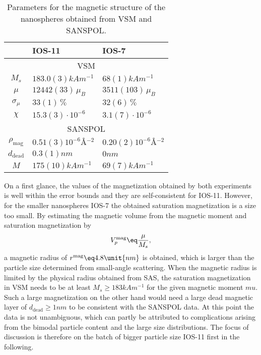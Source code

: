 \documentclass[\main/dresen_thesis.tex]{subfiles}
\begin{document}
\begin{table}[tb]
  \centering
  \caption{\label{tab:looselyPackedNP:nanoparticle:vsmSanspol}Parameters for the magnetic structure of the nanospheres obtained from VSM and SANSPOL.}
  \begin{tabular}{ c | l | l }
      & IOS-11 & IOS-7 \\
    \hline
    \multicolumn{3}{c}{VSM}\\
    \hline
    $M_s$
      & $183.0(3) \unit{kAm^{-1}}$
      & $68(1) \unit{kAm^{-1}}$\\
    $\mu$
      & $12442(33) \, \mu_B$
      & $3511(103) \, \mu_B$\\
    $\sigma_{\mu}$
      & $33(1) \, \%$
      & $32(6) \, \%$\\
    $\chi$
      & $15.3(3) \cdot \unit{10^{-6}}$
      & $3.1(7) \cdot \unit{10^{-6}}$\\
    \hline
    \multicolumn{3}{c}{SANSPOL}\\
    \hline
    $\rho_\mathrm{mag}$
      & $0.51(3) \unit{10^{-6} \angstrom^{-2}}$
      & $0.20(2) \unit{10^{-6} \angstrom^{-2}}$\\
    $d_\mathrm{dead}$
      & $0.3(1) \unit{nm}$
      & $0 \unit{nm}$\\
    $M$
      & $175(10) \unit{kAm^{-1}}$
      & $69(7) \unit{kAm^{-1}}$\\
    \hline
  \end{tabular}
\end{table}

On a first glance, the values of the magnetization obtained by both experiments is well within the error bounds and they are self-consistent for IOS-11.
However, for the smaller nanospheres IOS-7 the obtained saturation magnetization is a size too small.
By estimating the magnetic volume from the magnetic moment and saturation magnetization by
\begin{align}
  V_p^\mathrm{mag} \eq \frac{\mu}{M_s},
\end{align}
a magnetic radius of $r^\mathrm{mag} \eq 4.8 \unit{nm}$ is obtained, which is larger than the particle size determined from small-angle scattering.
When the magnetic radius is limited by the physical radius obtained from SAS, the saturation magnetization in VSM needs to be at least $M_s \geq 183 \unit{kAm^{-1}}$ for the given magnetic moment $mu$.
Such a large magnetization on the other hand would need a large dead magnetic layer of $d_\mathrm{dead} \geq 1 \unit{nm}$ to be consistent with the SANSPOL data.
At this point the data is not unambiguous, which can partly be attributed to complications arising from the bimodal particle content and the large size distributions.
The focus of discussion is therefore on the batch of bigger particle size IOS-11 first in the following.
\end{document}
